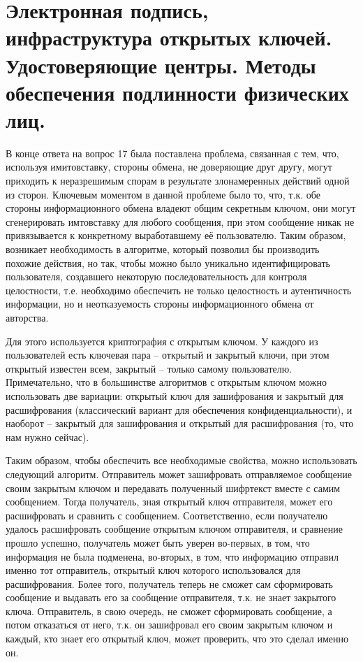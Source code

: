 \section{Электронная подпись, инфраструктура открытых ключей. Удостоверяющие центры. Методы обеспечения подлинности физических лиц.}

В конце ответа на вопрос 17 была поставлена проблема, связанная с тем, что, используя имитовставку, стороны обмена, не доверяющие друг другу, могут приходить к неразрешимым спорам в результате злонамеренных действий одной из сторон. Ключевым моментом в данной проблеме было то, что, т.к. обе стороны информационного обмена владеют общим секретным ключом, они могут сгенерировать имтовставку для любого сообщения, при этом сообщение никак не привязывается к конкретному выработавшему её пользователю. Таким образом, возникает необходимость в алгоритме, который позволил бы производить похожие действия, но так, чтобы можно было уникально идентифицировать пользователя, создавшего некоторую последовательность для контроля целостности, т.е. необходимо обеспечить не только целостность и аутентичность информации, но и неотказуемость стороны информационного обмена от авторства. 

Для этого используется криптография с открытым ключом. У каждого из пользователей есть ключевая пара -- открытый и закрытый ключи, при этом открытый известен всем, закрытый -- только самому пользователю. Примечательно, что в большинстве алгоритмов с открытым ключом можно использовать две вариации: открытый ключ для зашифрования и закрытый для расшифрования (классический вариант для обеспечения конфиденциальности), и наоборот -- закрытый для зашифрования и открытый для расшифрования (то, что нам нужно сейчас). 

Таким образом, чтобы обеспечить все необходимые свойства, можно использовать следующий алгоритм. Отправитель может зашифровать отправляемое сообщение своим закрытым ключом и передавать полученный шифртекст вместе с самим сообщением. Тогда получатель, зная открытый ключ отправителя, может его расшифровать и сравнить с сообщением. Соответственно, если получателю удалось расшифровать сообщение открытым ключом отправителя, и сравнение прошло успешно, получатель может быть уверен во-первых, в том, что информация не была подменена, во-вторых, в том, что информацию отправил именно тот отправитель, открытый ключ которого использовался для расшифрования. Более того, получатель теперь не сможет сам сформировать сообщение и выдавать его за сообщение отправителя, т.к. не знает закрытого ключа. Отправитель, в свою очередь, не сможет сформировать сообщение, а потом отказаться от него, т.к. он зашифровал его своим закрытым ключом и каждый, кто знает его открытый ключ, может проверить, что это сделал именно он.

